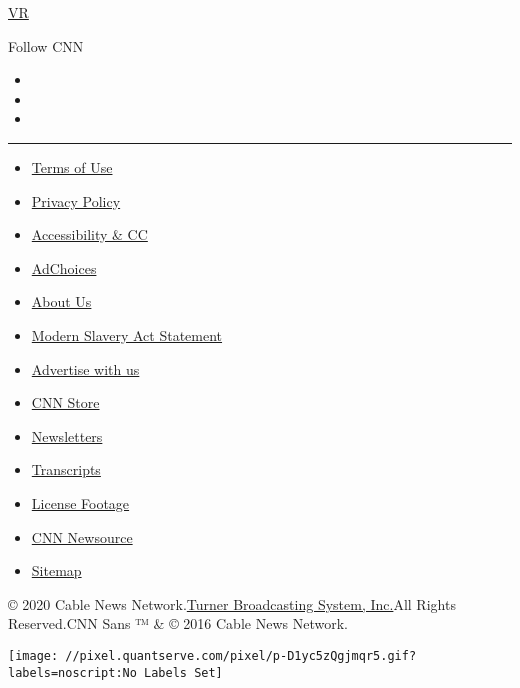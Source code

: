 \href{/vr}{VR}

Follow CNN

\begin{itemize}
\item
\item
\item
\end{itemize}

\begin{center}\rule{0.5\linewidth}{\linethickness}\end{center}

\begin{itemize}
\tightlist
\item
  \href{/terms}{Terms of Use}
\item
  \href{/privacy}{Privacy Policy}
\item
  \href{/accessibility}{Accessibility \& CC}
\item
  \protect\hyperlink{}{AdChoices}
\item
  \href{/about}{About Us}
\item
  \href{/msa}{Modern Slavery Act Statement}
\item
  \href{https://commercial.cnn.com}{Advertise with us}
\item
  \href{//store.cnn.com}{CNN Store}
\item
  \href{/newsletters}{Newsletters}
\item
  \href{/transcripts}{Transcripts}
\item
  \href{/collection}{License Footage}
\item
  \href{http://cnnnewsource.com}{CNN Newsource}
\item
  \href{https://www.cnn.com/sitemap.html}{Sitemap}
\end{itemize}

© 2020 Cable News Network.\href{//www.turner.com}{Turner Broadcasting
System, Inc.}All Rights Reserved.CNN Sans ™ \& © 2016 Cable News
Network.

\texttt{[image: //pixel.quantserve.com/pixel/p-D1yc5zQgjmqr5.gif?labels=noscript:No Labels Set]}
